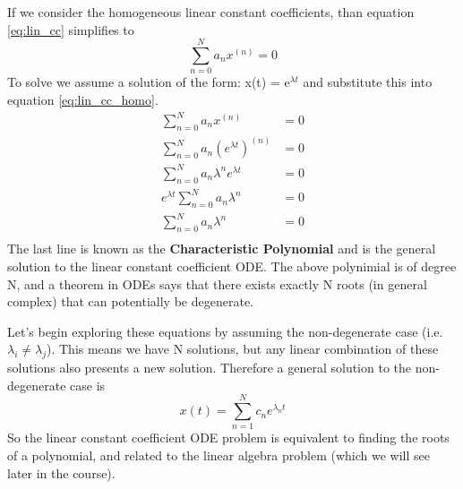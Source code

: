 \documentclass{article}
\newcommand{\be}{\begin{equation}}
\newcommand{\ee}{\end{equation}}
\begin{document}
If we consider the homogeneous linear constant coefficients, than equation \ref{eq:lin_cc} simplifies to
\be \label{eq:lin_cc_homo}
\sum_{n=0}^N a_nx^{(n)} = 0
\ee
To solve we assume a solution of the form: x(t) = e$^{\lambda t}$ and substitute this into equation \ref{eq:lin_cc_homo}.
\be
\begin{split}
    \sum_{n=0}^N a_nx^{(n)} &= 0\\
    \sum_{n=0}^N a_n \left(e^{\lambda t}\right) ^{(n)} &= 0\\
    \sum_{n=0}^N a_n \lambda^n e^{\lambda t} &= 0\\
    e^{\lambda t} \sum_{n=0}^N a_n \lambda^n &= 0\\
    \sum_{n=0}^N a_n \lambda^n &= 0\\
\end{split}
\ee
The last line is known as the \textbf{Characteristic Polynomial} and is the general solution to the linear constant coefficient ODE.
The above polynimial is of degree N, and a theorem in  ODEs says that there exists exactly N roots (in general complex) that can potentially be degenerate. 

Let's begin exploring these equations by assuming the non-degenerate case (i.e. $\lambda_i \neq \lambda_j$). 
This means we have N solutions, but any linear combination of these solutions also presents a new solution.
Therefore a general solution to the non-degenerate case is 
\be
x(t) = \sum_{n=1}^N c_n e^{\lambda_nt}
\ee
So the linear constant coefficient ODE problem is equivalent to finding the roots of a polynomial, and related to the linear algebra problem (which we will see later in the course). 
\end{document}
